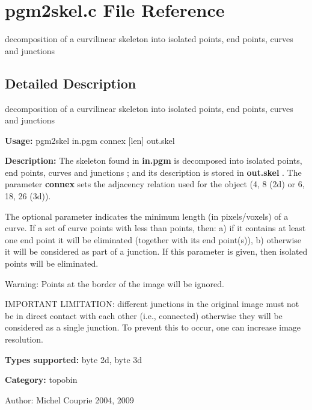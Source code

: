 \section{pgm2skel.c File Reference}
\label{pgm2skel_8c}
decomposition of a curvilinear skeleton into isolated points, end points, curves and junctions  




\label{_details}
\subsection{Detailed Description}
decomposition of a curvilinear skeleton into isolated points, end points, curves and junctions 

{\bf Usage:} pgm2skel in.pgm connex [len] out.skel

{\bf Description:} The skeleton found in {\bf in.pgm} is decomposed into isolated points, end points, curves and junctions ; and its description is stored in {\bf out.skel} . The parameter {\bf connex} sets the adjacency relation used for the object (4, 8 (2d) or 6, 18, 26 (3d)).

The optional parameter  indicates the minimum length (in pixels/voxels) of a curve. If a set of curve points with less than  points, then: a) if it contains at least one end point it will be eliminated (together with its end point(s)), b) otherwise it will be considered as part of a junction. If this parameter is given, then isolated points will be eliminated.

\begin{Desc}
\item[Warning:]Points at the border of the image will be ignored.

IMPORTANT LIMITATION: different junctions in the original image must not be in direct contact with each other (i.e., connected) otherwise they will be considered as a single junction. To prevent this to occur, one can increase image resolution.\end{Desc}
{\bf Types supported:} byte 2d, byte 3d

{\bf Category:} topobin

\begin{Desc}
\item[Author:]Michel Couprie 2004, 2009 \end{Desc}
